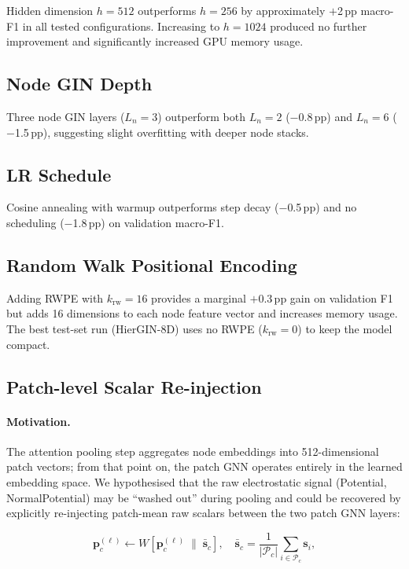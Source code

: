 Hidden dimension $h=512$ outperforms $h=256$ by approximately $+$2\,pp
macro-F1 in all tested configurations.
Increasing to $h=1024$ produced no further improvement and significantly
increased GPU memory usage.

\subsection{Node GIN Depth}

Three node GIN layers ($L_n = 3$) outperform both $L_n = 2$ ($-$0.8\,pp) and
$L_n = 6$ ($-$1.5\,pp), suggesting slight overfitting with deeper node
stacks.

\subsection{LR Schedule}

Cosine annealing with warmup outperforms step decay ($-$0.5\,pp) and no
scheduling ($-$1.8\,pp) on validation macro-F1.

\subsection{Random Walk Positional Encoding}

Adding RWPE with $k_\text{rw} = 16$ provides a marginal $+$0.3\,pp gain on
validation F1 but adds 16 dimensions to each node feature vector and
increases memory usage.
The best test-set run (HierGIN-8D) uses no RWPE ($k_\text{rw} = 0$) to keep
the model compact.

\subsection{Patch-level Scalar Re-injection}
\label{sec:ablation:patch_inject}

\paragraph{Motivation.}
The attention pooling step aggregates node embeddings into 512-dimensional
patch vectors; from that point on, the patch GNN operates entirely in the
learned embedding space.
We hypothesised that the raw electrostatic signal (Potential, NormalPotential)
may be ``washed out'' during pooling and could be recovered by explicitly
re-injecting patch-mean raw scalars between the two patch GNN layers:

\begin{equation}
  \mathbf{p}_c^{(\ell)} \leftarrow
  W \!\left[\mathbf{p}_c^{(\ell)} \;\Big\|\; \bar{\mathbf{s}}_c\right],
  \quad
  \bar{\mathbf{s}}_c = \frac{1}{|\mathcal{P}_c|}
    \sum_{i \in \mathcal{P}_c} \mathbf{s}_i,
\end{equation}

